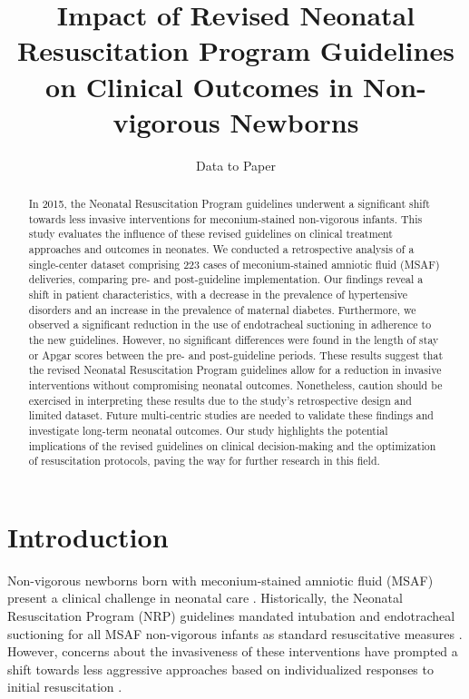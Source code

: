 \documentclass[11pt]{article}
\title{Impact of Revised Neonatal Resuscitation Program Guidelines on Clinical Outcomes in Non-vigorous Newborns}
\author{Data to Paper}
\begin{document}
\maketitle
\begin{abstract}In 2015, the Neonatal Resuscitation Program guidelines underwent a significant shift towards less invasive interventions for meconium-stained non-vigorous infants. This study evaluates the influence of these revised guidelines on clinical treatment approaches and outcomes in neonates. We conducted a retrospective analysis of a single-center dataset comprising 223 cases of meconium-stained amniotic fluid (MSAF) deliveries, comparing pre- and post-guideline implementation. Our findings reveal a shift in patient characteristics, with a decrease in the prevalence of hypertensive disorders and an increase in the prevalence of maternal diabetes. Furthermore, we observed a significant reduction in the use of endotracheal suctioning in adherence to the new guidelines. However, no significant differences were found in the length of stay or Apgar scores between the pre- and post-guideline periods. These results suggest that the revised Neonatal Resuscitation Program guidelines allow for a reduction in invasive interventions without compromising neonatal outcomes. Nonetheless, caution should be exercised in interpreting these results due to the study's retrospective design and limited dataset. Future multi-centric studies are needed to validate these findings and investigate long-term neonatal outcomes. Our study highlights the potential implications of the revised guidelines on clinical decision-making and the optimization of resuscitation protocols, paving the way for further research in this field.\end{abstract}
\section*{Introduction}

Non-vigorous newborns born with meconium-stained amniotic fluid (MSAF) present a clinical challenge in neonatal care \cite{Polin2014SurfactantRT, Woldu2014AssessmentOT}. Historically, the Neonatal Resuscitation Program (NRP) guidelines mandated intubation and endotracheal suctioning for all MSAF non-vigorous infants as standard resuscitative measures \cite{Wiswell2000DeliveryRM}. However, concerns about the invasiveness of these interventions have prompted a shift towards less aggressive approaches based on individualized responses to initial resuscitation \cite{Zhu2020ClinicalAO, Zimmermann2020COVID19IC}.
\end{document}
